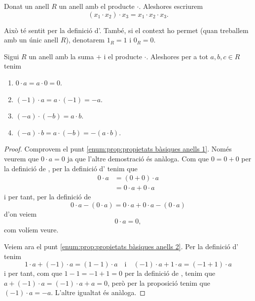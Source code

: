 \documentclass[../Apunts.tex]{subfiles}
\begin{document}
	\begin{notation}
		Donat un anell \(R\) un anell amb el producte \(\cdot\). Aleshores escriurem
		\[(x_{1}\cdot x_{2})\cdot x_{3}=x_{1}\cdot x_{2}\cdot x_{3}.\]
		
		Això té sentit per la definició d'. També, si el context ho permet (quan treballem amb un únic anell \(R\)), denotarem \(1_{R}=1\) i \(0_{R}=0\).
	\end{notation}
	\begin{proposition}
		\label{prop:propietats bàsiques anells}
		Sigui \(R\) un anell amb la suma \(+\) i el producte \(\cdot\). Aleshores per a tot \(a,b,c\in R\) tenim
		\begin{enumerate}
			\item\label{enum:prop:propietats bàsiques anells 1} \(0\cdot a=a\cdot0=0\).
			\item\label{enum:prop:propietats bàsiques anells 2} \((-1)\cdot a=a\cdot(-1)=-a\).
			\item\label{enum:prop:propietats bàsiques anells 3} \((-a)\cdot(-b)=a\cdot b\).
			\item\label{enum:prop:propietats bàsiques anells 4} \((-a)\cdot b=a\cdot(-b)=-(a\cdot b)\).
		\end{enumerate}
		\begin{proof}
			Comprovem el punt \eqref{enum:prop:propietats bàsiques anells 1}. Només veurem que \(0\cdot a=0\) ja que l'altre demostració és anàloga. Com que \(0=0+0\) per la definició de , per la definició d' tenim que
			\begin{align*}
			0\cdot a&=(0+0)\cdot a\\
			&=0\cdot a+0\cdot a
			\end{align*}
			i per tant, per la definició de 
			\[0\cdot a-(0\cdot a)=0\cdot a+0\cdot a-(0\cdot a)\]
			d'on veiem
			\[0\cdot a=0,\]
			com volíem veure.
			
			Veiem ara el punt \eqref{enum:prop:propietats bàsiques anells 2}. Per la definició d' tenim
			\[1\cdot a+(-1)\cdot a=(1-1)\cdot a\quad\text{i}\quad(-1)\cdot a+1\cdot a=(-1+1)\cdot a\]
			i per tant, com que \(1-1=-1+1=0\) per la definició de , tenim que \(a+(-1)\cdot a=(-1)\cdot a+a=0\), però per la proposició  tenim que \((-1)\cdot a=-a\). L'altre igualtat és anàloga.
			

\end{proof}
\end{proposition}
\end{document}
